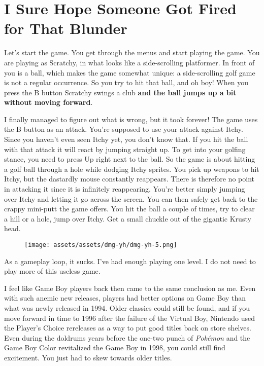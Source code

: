 \documentclass{book}
\begin{document}
\FloatBarrier\needspace{10mm}\section*{I Sure Hope Someone Got Fired for That Blunder}\nopagebreak[4]

Let’s start the game. You get through the menus and start playing the game. You are playing as Scratchy, in what looks like a side-scrolling platformer. In front of you is a ball, which makes the game somewhat unique: a side-scrolling golf game is not a regular occurrence. So you try to hit that ball, and oh boy! When you press the B button Scratchy swings a club \textbf{and the ball jumps up a bit without moving forward}.



I finally managed to figure out what is wrong, but it took forever! The game uses the B button as an attack. You’re supposed to use your attack against Itchy. Since you haven’t even seen Itchy yet, you don’t know that. If you hit the ball with that attack it will react by jumping straight up. To get into your golfing stance, you need to press Up right next to the ball. So the game is about hitting a golf ball through a hole while dodging Itchy sprites. You pick up weapons to hit Itchy, but the dastardly mouse constantly reappears. There is therefore no point in attacking it since it is infinitely reappearing. You’re better simply jumping over Itchy and letting it go across the screen. You can then safely get back to the crappy mini-putt the game offers. You hit the ball a couple of times, try to clear a hill or a hole, jump over Itchy. Get a small chuckle out of the gigantic Krusty head.

\begin{figure}[hbt]
\vskip 10pt
\centering \texttt{[image: assets/assets/dmg-yh/dmg-yh-5.png]}
\vskip 6pt
\end{figure}

As a gameplay loop, it sucks. I’ve had enough playing one level. I do not need to play more of this useless game.

I feel like Game Boy players back then came to the same conclusion as me. Even with such anemic new releases, players had better options on Game Boy than what was newly released in 1994. Older classics could still be found, and if you move forward in time to 1996 after the failure of the Virtual Boy, Nintendo used the Player’s Choice rereleases as a way to put good titles back on store shelves. Even during the doldrums years before the one-two punch of \emph{Pokémon} and the Game Boy Color revitalized the Game Boy in 1998, you could still find excitement. You just had to skew towards older titles.
\end{document}
